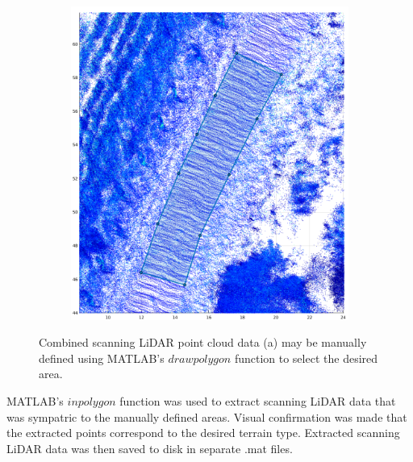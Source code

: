 \documentclass[numbered,pdftex]{ohio-etd}
\begin{document}
{{{{\begin{figure}[H]
\begin{subfigure}{0.45\textwidth}
						\includegraphics[width=1.0\linewidth]{Defense_Images/area_selected}
						\caption[Bean Hollow Road Camera View]{}
						\label{fig:area_selected}
					\end{subfigure}
					\caption[Manual Area Selection Process]{Combined scanning LiDAR point cloud data (a) may be manually defined using MATLAB's $drawpolygon$ function to select the desired area. }
					\label{fig:Area_Selection_Process}
				\end{figure}
				
				{MATLAB's $inpolygon$ function was used to extract scanning LiDAR data that was sympatric to the manually defined areas. Visual confirmation was made that the extracted points correspond to the desired terrain type. Extracted scanning LiDAR data was then saved to disk in separate .mat files.}
				
}}}}
\end{document}
